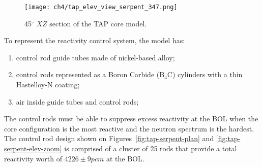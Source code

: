 \begin{figure}[htp!] %
	\centering
	\texttt{[image: ch4/tap\_elev\_view\_serpent\_347.png]}
	\caption{45$^{\circ}$ $XZ$ section of the \gls{TAP} core model.}
	\label{fig:tap-serpent-elev}
\end{figure}

To represent the reactivity control system, the model has: 
\begin{enumerate}[label=(\alph*), noitemsep]
	\item control rod guide tubes made of nickel-based alloy;
	\item control rods represented as a Boron Carbide (B$_4$C) cylinders 
	with a thin Hastelloy-N coating;
	\item air inside guide tubes and control rods;
\end{enumerate}
The control rods must be able to suppress excess reactivity at the \gls{BOL} 
when the core configuration is the most reactive and the neutron spectrum is 
the hardest. The control rod design shown on 
Figures~\ref{fig:tap-serpent-plan} and \ref{fig:tap-serpent-elev-zoom} is 
comprised of a cluster of 25 rods that provide a total reactivity worth of 
$4226\pm9pcm$ at the \gls{BOL}.

